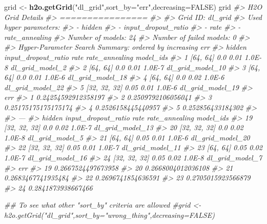 \documentclass[]{book}
\newenvironment{Shaded}{\begin{snugshade}}{\end{snugshade}}
\newcommand{\CommentTok}[1]{\textcolor[rgb]{0.56,0.35,0.01}{\textit{#1}}}
\newcommand{\DataTypeTok}[1]{\textcolor[rgb]{0.13,0.29,0.53}{#1}}
\newcommand{\KeywordTok}[1]{\textcolor[rgb]{0.13,0.29,0.53}{\textbf{#1}}}
\newcommand{\NormalTok}[1]{#1}
\newcommand{\OtherTok}[1]{\textcolor[rgb]{0.56,0.35,0.01}{#1}}
\newcommand{\StringTok}[1]{\textcolor[rgb]{0.31,0.60,0.02}{#1}}
\begin{document}
\begin{Shaded}
\begin{Highlighting}[]
\NormalTok{grid <-}\StringTok{ }\KeywordTok{h2o.getGrid}\NormalTok{(}\StringTok{"dl_grid"}\NormalTok{,}\DataTypeTok{sort_by=}\StringTok{"err"}\NormalTok{,}\DataTypeTok{decreasing=}\OtherTok{FALSE}\NormalTok{)}
\NormalTok{grid}
\CommentTok{#> H2O Grid Details}
\CommentTok{#> ================}
\CommentTok{#> }
\CommentTok{#> Grid ID: dl_grid }
\CommentTok{#> Used hyper parameters: }
\CommentTok{#>   -  hidden }
\CommentTok{#>   -  input_dropout_ratio }
\CommentTok{#>   -  rate }
\CommentTok{#>   -  rate_annealing }
\CommentTok{#> Number of models: 24 }
\CommentTok{#> Number of failed models: 0 }
\CommentTok{#> }
\CommentTok{#> Hyper-Parameter Search Summary: ordered by increasing err}
\CommentTok{#>         hidden input_dropout_ratio rate rate_annealing        model_ids}
\CommentTok{#> 1     [64, 64]                 0.0 0.01         1.0E-8  dl_grid_model_2}
\CommentTok{#> 2     [64, 64]                 0.0 0.01         1.0E-7 dl_grid_model_10}
\CommentTok{#> 3     [64, 64]                 0.0 0.01         1.0E-6 dl_grid_model_18}
\CommentTok{#> 4     [64, 64]                 0.0 0.02         1.0E-6 dl_grid_model_22}
\CommentTok{#> 5 [32, 32, 32]                0.05 0.01         1.0E-6 dl_grid_model_19}
\CommentTok{#>                   err}
\CommentTok{#> 1 0.24254592912358197}
\CommentTok{#> 2  0.2509792106056041}
\CommentTok{#> 3 0.25175175175175174}
\CommentTok{#> 4  0.2526158445440957}
\CommentTok{#> 5   0.252856433184302}
\CommentTok{#> }
\CommentTok{#> ---}
\CommentTok{#>          hidden input_dropout_ratio rate rate_annealing        model_ids}
\CommentTok{#> 19 [32, 32, 32]                 0.0 0.02         1.0E-7 dl_grid_model_13}
\CommentTok{#> 20 [32, 32, 32]                 0.0 0.02         1.0E-8  dl_grid_model_5}
\CommentTok{#> 21     [64, 64]                0.05 0.01         1.0E-6 dl_grid_model_20}
\CommentTok{#> 22 [32, 32, 32]                0.05 0.01         1.0E-7 dl_grid_model_11}
\CommentTok{#> 23     [64, 64]                0.05 0.02         1.0E-7 dl_grid_model_16}
\CommentTok{#> 24 [32, 32, 32]                0.05 0.02         1.0E-8  dl_grid_model_7}
\CommentTok{#>                   err}
\CommentTok{#> 19 0.2667524497673958}
\CommentTok{#> 20 0.2668004012036108}
\CommentTok{#> 21 0.2683467741935484}
\CommentTok{#> 22 0.2696741854636591}
\CommentTok{#> 23 0.2705015923566879}
\CommentTok{#> 24 0.2841873938667466}

\CommentTok{## To see what other "sort_by" criteria are allowed}
\CommentTok{#grid <- h2o.getGrid("dl_grid",sort_by="wrong_thing",decreasing=FALSE)}


\end{Highlighting}
\end{Shaded}
\end{document}
